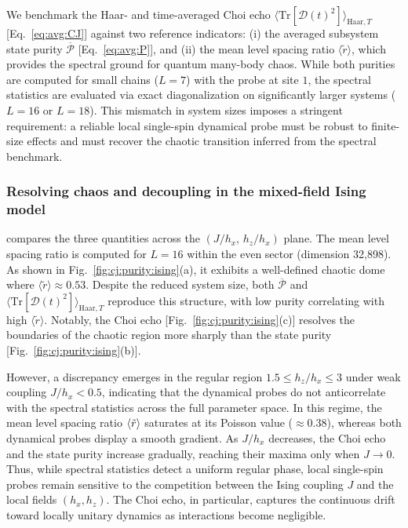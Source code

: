 \documentclass[pra,twocolumn,aps,showpacs,superscriptaddress,longbibliography]{revtex4-2}%
\newcommand{\choip}{\langle \text{Tr}[\mathcal{D}(t)^2] \rangle_{\mathrm{Haar}, T}} %
\newcommand{\statep}{\overline{\mathcal{P}}}
\newcommand{\mlsr}{\ev{\tilde{r}}}
\providecommand{\DIFadd}[1]{{\protect\color{blue} \sf #1}} %
\providecommand{\DIFdel}[1]{{\protect\color{red} \scriptsize #1}} %
\providecommand{\DIFaddbegin}{} %
\providecommand{\DIFaddend}{} %
\providecommand{\DIFdelbegin}{} %
\providecommand{\DIFdelend}{} %
\begin{document}
\DIFdelend We benchmark the Haar- and time-averaged Choi echo $\choip$ [Eq.~\eqref{eq:avg:CJ}] against two reference indicators:  
(i) the averaged subsystem state purity $\statep$ [Eq.~\eqref{eq:avg:P}], and  
(ii) the mean level spacing ratio $\langle \tilde{r} \rangle$, which provides the spectral ground for quantum many-body chaos. While both purities are computed for small chains ($L=7$) with the probe at site $1$, the spectral statistics are evaluated via exact diagonalization on significantly larger systems ($L=16$ or $L=18$). This mismatch in system sizes imposes a stringent requirement: a reliable \DIFdelbegin \DIFdel{local }\DIFdelend \DIFaddbegin \DIFadd{single-spin }\DIFaddend dynamical probe must be robust to finite-size effects and must recover the chaotic transition inferred from the spectral benchmark.

\subsubsection{Resolving chaos and decoupling in the mixed-field Ising model}
 compares the three quantities across the $(J/h_x,\,h_z/h_x)$ plane. The mean level spacing ratio is computed for $L=16$ within the even sector (dimension 32,898). As shown in Fig.~\ref{fig:cj:purity:ising}(a), it exhibits a well-defined chaotic dome where $\langle \tilde{r} \rangle \approx 0.53$. Despite the reduced system size, both $\statep$ and $\choip$ reproduce this structure, with low purity correlating with high $\langle \tilde{r} \rangle$. Notably, the Choi echo [Fig.~\ref{fig:cj:purity:ising}(c)] resolves the boundaries of the chaotic region more sharply than the state purity [Fig.~\ref{fig:cj:purity:ising}(b)].

However, a discrepancy emerges in the regular region $1.5 \le h_z/h_x \le 3$ under weak coupling $J/h_x < 0.5$, indicating that the dynamical probes do not anticorrelate with the spectral statistics across the full parameter space. In this regime, the mean level spacing ratio $\mlsr$ saturates at its Poisson value ($\approx 0.38$), whereas both dynamical probes display a smooth gradient. As $J/h_x$ decreases, the Choi echo and the state purity increase gradually, reaching their maxima only when $J \to 0$. Thus, while spectral statistics detect a uniform regular phase, \DIFdelbegin \DIFdel{local }\DIFdelend \DIFaddbegin \DIFadd{single-spin }\DIFaddend probes remain sensitive to the competition between the Ising coupling $J$ and the local fields $(h_x, h_z)$. The Choi echo, in particular, captures the continuous drift toward locally unitary dynamics as interactions become negligible.
\end{document}
